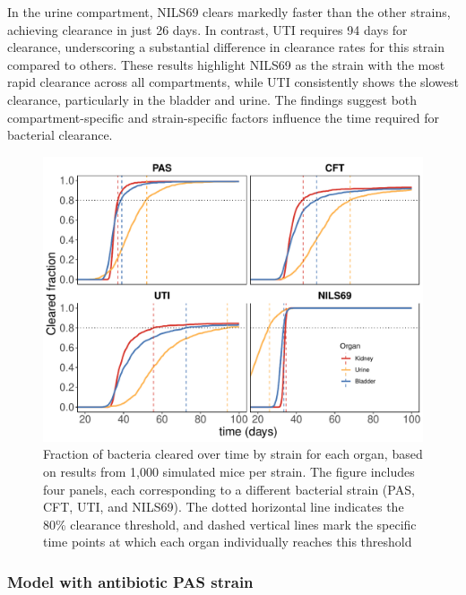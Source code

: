 \documentclass{article}
\begin{document}
In the urine compartment, NILS69 clears markedly faster than the other strains, achieving clearance in just 26 days. In contrast, UTI requires 94 days for clearance, underscoring a substantial difference in clearance rates for this strain compared to others. These results highlight NILS69 as the strain with the most rapid clearance across all compartments, while UTI consistently shows the slowest clearance, particularly in the bladder and urine. The findings suggest both compartment-specific and strain-specific factors influence the time required for bacterial clearance.



\begin{figure}
	\centering
	\includegraphics[width=\linewidth]{images/plt_final_model_Ct_strain_ALL_Clearence_Simul.pdf}
	\caption{Fraction of bacteria cleared over time by strain for each organ, based on results from 1,000 simulated mice per strain. The figure includes four panels, each corresponding to a different bacterial strain (PAS, CFT, UTI, and NILS69). The dotted horizontal line indicates the 80\% clearance threshold, and dashed vertical lines mark the specific time points at which each organ individually reaches this threshold}
	\label{fig:SimulationsClearedStrainsALL}
\end{figure}




\subsubsection{Model with antibiotic PAS strain}
\end{document}
